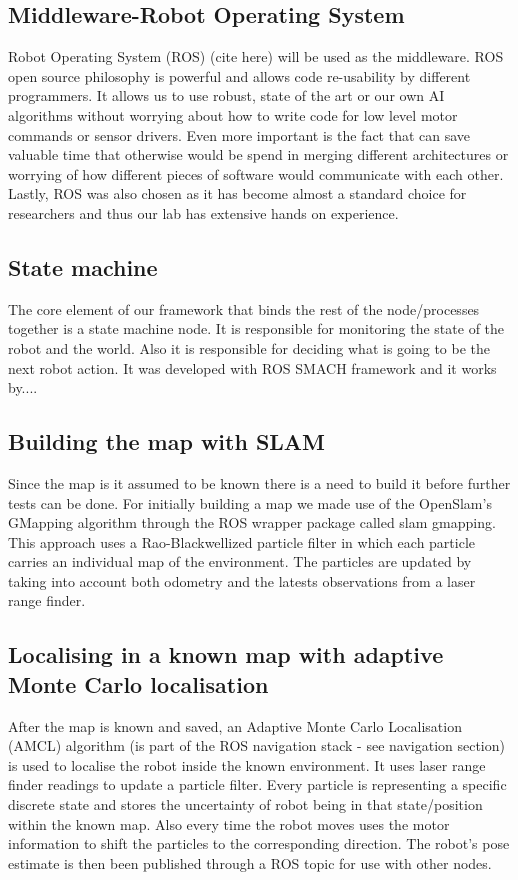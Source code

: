 \documentclass[conference]{IEEEtran}
\begin{document}
\subsection{Middleware-Robot Operating System}
Robot Operating System (ROS) (cite here) will be used as the middleware. ROS open source philosophy is powerful and allows code re-usability by different programmers. It allows us to use robust, state of the art or our own AI algorithms without worrying about how to write code for low level motor commands or sensor drivers. Even more important is the fact that can save valuable time that otherwise would be spend in merging different architectures or worrying of how different pieces of software would communicate with each other. Lastly, ROS was also chosen as it has become almost a standard choice for researchers and thus our lab has extensive hands on experience.

\subsection{State machine}
The core element of our framework that binds the rest of the node/processes together is a state machine node. It is responsible for monitoring the state of the robot and the world. Also it is responsible for deciding what is going to be the next robot action. It was developed with ROS SMACH framework and it works by....

\subsection{Building the map with SLAM}
Since the map is it assumed to be known there is a need to build it before further tests can be done. For initially building a map we made use of the OpenSlam's GMapping algorithm \cite{slam} through the ROS wrapper package called slam gmapping. This approach uses a Rao-Blackwellized particle filter in which each particle carries an individual map of the environment.  The particles are updated by taking into account both odometry and the latests observations from a laser range finder.

\subsection{Localising in a known map with adaptive Monte Carlo localisation}
After the map is known and saved, an Adaptive Monte Carlo Localisation (AMCL)\cite{amcl} algorithm (is part of the ROS navigation stack - see navigation section) is used to localise the robot inside the known environment. It uses laser range finder readings to update a particle filter. Every particle is representing a specific discrete state and stores the uncertainty of robot being in that state/position within the known map. Also every time the robot moves uses the motor information to shift the particles to the corresponding direction. The robot's pose estimate is then been published through a ROS topic for use with other nodes.
\end{document}
